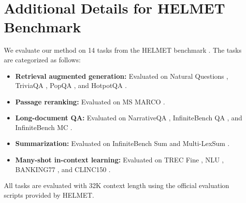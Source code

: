 \section{Additional Details for HELMET Benchmark}
\label{app:benchmark}

We evaluate our method on 14 tasks from the HELMET benchmark \cite{helmet}. The tasks are categorized as follows:
\begin{itemize}
    \item \textbf{Retrieval augmented generation:} Evaluated on Natural Questions \cite{nq}, TriviaQA \cite{triviaqa}, PopQA \cite{popqa}, and HotpotQA \cite{hotpotqa}.
    \item \textbf{Passage reranking:} Evaluated on MS MARCO \cite{msmacro}.
    \item \textbf{Long-document QA:} Evaluated on NarrativeQA \cite{narrativeqa}, InfiniteBench QA \cite{infinitebench}, and InfiniteBench MC \cite{infinitebench}.
    \item \textbf{Summarization:} Evaluated on InfiniteBench Sum \cite{infinitebench} and Multi-LexSum \cite{lexsum}.
    \item \textbf{Many-shot in-context learning:} Evaluated on TREC Fine \cite{trec}, NLU \cite{nlu}, BANKING77 \cite{banking}, and CLINC150 \cite{clinc}.
\end{itemize}
All tasks are evaluated with 32K context length using the official evaluation scripts provided by HELMET.